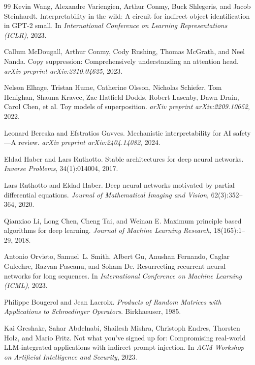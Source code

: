 \documentclass[10pt,twocolumn]{article}
\begin{document}
\begin{thebibliography}{99}
Kevin Wang, Alexandre Variengien, Arthur Conmy, Buck Shlegeris, and Jacob Steinhardt.
\newblock Interpretability in the wild: A circuit for indirect object identification in GPT-2 small.
\newblock In \emph{International Conference on Learning Representations (ICLR)}, 2023.

Callum McDougall, Arthur Conmy, Cody Rushing, Thomas McGrath, and Neel Nanda.
\newblock Copy suppression: Comprehensively understanding an attention head.
\newblock \emph{arXiv preprint arXiv:2310.04625}, 2023.

Nelson Elhage, Tristan Hume, Catherine Olsson, Nicholas Schiefer, Tom Henighan, Shauna Kravec, Zac Hatfield-Dodds, Robert Lasenby, Dawn Drain, Carol Chen, et al.
\newblock Toy models of superposition.
\newblock \emph{arXiv preprint arXiv:2209.10652}, 2022.

Leonard Bereska and Efstratios Gavves.
\newblock Mechanistic interpretability for AI safety---A review.
\newblock \emph{arXiv preprint arXiv:2404.14082}, 2024.

Eldad Haber and Lars Ruthotto.
\newblock Stable architectures for deep neural networks.
\newblock \emph{Inverse Problems}, 34(1):014004, 2017.

Lars Ruthotto and Eldad Haber.
\newblock Deep neural networks motivated by partial differential equations.
\newblock \emph{Journal of Mathematical Imaging and Vision}, 62(3):352--364, 2020.

Qianxiao Li, Long Chen, Cheng Tai, and Weinan E.
\newblock Maximum principle based algorithms for deep learning.
\newblock \emph{Journal of Machine Learning Research}, 18(165):1--29, 2018.

Antonio Orvieto, Samuel~L. Smith, Albert Gu, Anushan Fernando, Caglar Gulcehre, Razvan Pascanu, and Soham De.
\newblock Resurrecting recurrent neural networks for long sequences.
\newblock In \emph{International Conference on Machine Learning (ICML)}, 2023.

Philippe Bougerol and Jean Lacroix.
\newblock \emph{Products of Random Matrices with Applications to Schroedinger Operators}.
\newblock Birkhaeuser, 1985.

Kai Greshake, Sahar Abdelnabi, Shailesh Mishra, Christoph Endres, Thorsten Holz, and Mario Fritz.
\newblock Not what you've signed up for: Compromising real-world LLM-integrated applications with indirect prompt injection.
\newblock In \emph{ACM Workshop on Artificial Intelligence and Security}, 2023.


\end{thebibliography}
\end{document}
